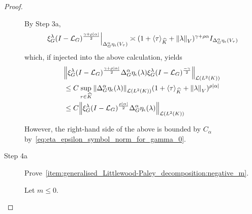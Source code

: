\begin{proof}
\begin{description}
            By Step 3a,
            \begin{align*}
                \eval {%
                    \Rep \lambda \BesselPotential {\gamma + \rho \abs \alpha}
                    } {\DifferenceOperatorOrder \alpha \eta_\epsilon(V_\tau)}
                    \asymp
                    (1 + \JapaneseBracket \CompactGroup \tau + \norm \lambda)^{\gamma + \rho \alpha} \Id {\DifferenceOperatorOrder \alpha \eta_\epsilon(V_\tau)}
            \end{align*}
            which,
            if injected into the above calculation, yields
            \begin{align*}
                &\norm [\Lin {\Lebesgue 2 \CompactGroup}] {%
                    \Rep \lambda \BesselPotential {\gamma + \rho \abs \alpha}
                    \DifferenceOperatorOrder \alpha \eta_\epsilon (\lambda)
                    \Rep \lambda \BesselPotential {-\gamma}
                }\\
                &\leq C
                \sup_{\tau \in \dualGroup \CompactGroup}
                \norm [\Lin {\Lebesgue 2 \CompactGroup}] {%
                    \DifferenceOperatorOrder \alpha \eta_\epsilon (\lambda)
                }
                (1 + \JapaneseBracket \CompactGroup \tau + \norm \lambda)^{\rho \abs \alpha}\\
                &\leq C
                \norm [\Lin {\Lebesgue 2 \CompactGroup}] {%
                    \Rep \lambda \BesselPotential {\rho \abs \alpha}
                    \DifferenceOperatorOrder \alpha \eta_\epsilon (\lambda)
                }
            \end{align*}

            However,
            the right-hand side of the above is bounded by $C_\alpha$
            by~\eqref{eq:eta_epsilon_symbol_norm_for_gamma_0}.

        \item [Step 4a] Prove~\ref{item:generalised_Littlewood-Paley_decomposition:negative_m}.

            Let $m \leq 0$.


\end{description}
\end{proof}
